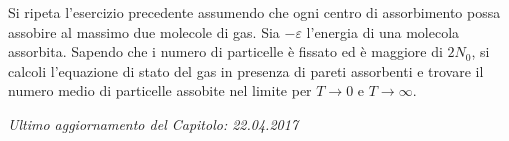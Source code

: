 \begin{Exercise}[title={Scatola a dobbia sorpresa},label={ex:05-sa2s}]
\noindent
Si ripeta l'esercizio precedente assumendo che ogni centro di assorbimento possa assobire al massimo due molecole di gas.
Sia $-\varepsilon$ l'energia di una molecola assorbita. Sapendo che i numero di particelle è fissato ed è maggiore di $2N_0$, si calcoli l'equazione di stato del gas in presenza di pareti assorbenti e trovare il numero medio di particelle assobite nel limite per $T\to 0$ e $T\to\infty$.
\end{Exercise}


\vskip 0.75cm
\begin{flushright}
{\em Ultimo aggiornamento del Capitolo: 22.04.2017}
\end{flushright}

